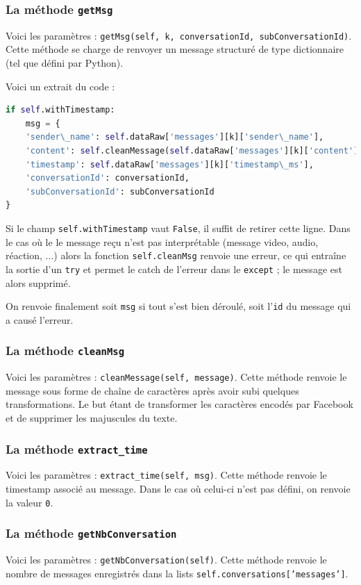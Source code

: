 \documentclass[10pt,a4paper]{article}
\begin{document}
\subsubsection{La méthode \texttt{getMsg}}
Voici les paramètres : \texttt{getMsg(self, k, conversationId, subConversationId)}. Cette méthode se charge de renvoyer un message structuré de type dictionnaire (tel que défini par Python).

Voici un extrait du code :
\begin{lstlisting}[language=Python]
if self.withTimestamp:
	msg = {
	'sender\_name': self.dataRaw['messages'][k]['sender\_name'],
	'content': self.cleanMessage(self.dataRaw['messages'][k]['content']),
	'timestamp': self.dataRaw['messages'][k]['timestamp\_ms'],
	'conversationId': conversationId,
	'subConversationId': subConversationId
}
\end{lstlisting}

Si le champ \texttt{self.withTimestamp} vaut \texttt{False}, il suffit de retirer cette ligne. Dans le cas où le le message reçu n'est pas interprétable (message video, audio, réaction, ...) alors la fonction \texttt{self.cleanMsg} renvoie une erreur, ce qui entraîne la sortie d'un \texttt{try} et permet le catch de l'erreur dans le \texttt{except} ; le message est alors supprimé.

On renvoie finalement soit \texttt{msg} si tout s'est bien déroulé, soit l'\texttt{id} du message qui a causé l'erreur.

\subsubsection{La méthode \texttt{cleanMsg}}
Voici les paramètres : \texttt{cleanMessage(self, message)}. Cette méthode renvoie le message sous forme de chaîne de caractères après avoir subi quelques transformations. Le but étant de transformer les caractères encodés par Facebook et de supprimer les majuscules du texte.

\subsubsection{La méthode \texttt{extract\_time}}
Voici les paramètres : \texttt{extract\_time(self, msg)}. Cette méthode renvoie le timestamp associé au message. Dans le cas où celui-ci n'est pas défini, on renvoie la valeur \texttt{0}.

\subsubsection{La méthode \texttt{getNbConversation}}
Voici les paramètres : \texttt{getNbConversation(self)}. Cette méthode renvoie le nombre de messages enregistrés dans la lists \texttt{self.conversations['messages']}.
\end{document}
